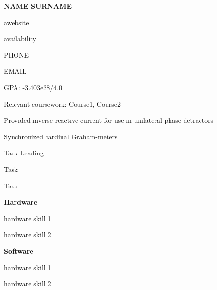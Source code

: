 \documentclass{resume}
\begin{document}
\begin{minipage}{0.6\textwidth}
	{\LARGE\bf \uppercase{Name Surname}}

	awebsite

	availability
\end{minipage}
\hfill
\begin{minipage}{0.3\textwidth}
	\hfill PHONE
	
	\hfill EMAIL
\end{minipage}

\begin{LIST}
    \item GPA: -3.403e38/4.0
    \item Relevant coursework: Course1, Course2
\end{LIST}

\vspace{-1.2em}
\begin{LIST}
	\item Provided inverse reactive current for use in unilateral phase detractors
	\item Synchronized cardinal Graham-meters
\end{LIST}

\begin{LIST}
	\item Task Leading
\end{LIST}

\begin{LIST}
	\item Task
\end{LIST}

\begin{LIST}
	\item Task
\end{LIST}

\vspace{-1em}
\begin{multicols*}{2}
\textbf{Hardware}
\begin{LIST}
	\item hardware skill 1
	\item hardware skill 2
\end{LIST}
\columnbreak
\textbf{Software}
\begin{LIST}
	\item hardware skill 1
	\item hardware skill 2
\end{LIST}
\end{multicols*}
\vfill
\end{document}

